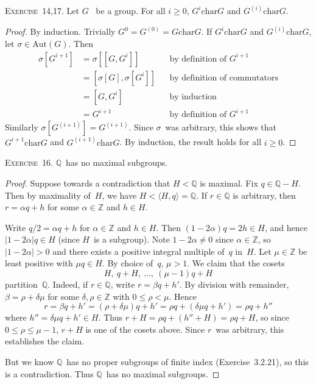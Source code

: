 \documentclass[letterpaper]{article}
\newcommand{\exercise}[1]{\goodbreak\noindent\textsc{Exercise~{#1}.}}
\newcommand{\Z}{\mathbb{Z}}
\newcommand{\Q}{\mathbb{Q}}
\newcommand{\aut}{\mathrm{Aut}}
\newcommand{\chr}{\mathrel{\mathrm{char}}}
\newcommand{\gen}[1]{\langle{#1}\rangle}
\newcommand{\abs}[1]{|{#1}|}
\begin{document}
\exercise{14,17}
Let $G$~ be a group. For all $i\ge0$, $G^i\chr G$ and $G^{(i)}\chr G$.
\begin{proof}
By induction. Trivially $G^0=G^{(0)}=G\chr G$. If $G^i\chr G$ and $G^{(i)}\chr G$, let $\sigma\in\aut(G)$. Then
\begin{align*}
\sigma[G^{i+1}]&=\sigma[[G,G^i]]&&\text{by definition of~$G^{i+1}$}\\
	&=[\sigma[G],\sigma[G^i]]&&\text{by definition of commutators}\\
	&=[G,G^i]&&\text{by induction}\\
	&=G^{i+1}&&\text{by definition of~$G^{i+1}$}
\end{align*}
Similarly $\sigma[G^{(i+1)}]=G^{(i+1)}$. Since $\sigma$~was arbitrary, this shows that $G^{i+1}\chr G$ and $G^{(i+1)}\chr G$. By induction, the result holds for all $i\ge0$.
\end{proof}

\exercise{16}
$\Q$~has no maximal subgroups.
\begin{proof}
Suppose towards a contradiction that $H<\Q$ is maximal. Fix $q\in\Q-H$. Then by maximality of~$H$, we have $H<\gen{H,q}=\Q$. If $r\in\Q$ is arbitrary, then $r=\alpha q+h$ for some $\alpha\in\Z$ and $h\in H$.

Write $q/2=\alpha q+h$ for $\alpha\in\Z$ and $h\in H$. Then $(1-2\alpha)q=2h\in H$, and hence $\abs{1-2\alpha}q\in H$ (since $H$~is a subgroup). Note $1-2\alpha\ne0$ since $\alpha\in\Z$, so $\abs{1-2\alpha}>0$ and there exists a positive integral multiple of~$q$ in~$H$. Let $\mu\in\Z$ be least positive with $\mu q\in H$. By choice of~$q$, $\mu>1$. We claim that the cosets
$$H,\ q+H,\ \ldots,\ (\mu-1)q+H$$
partition~$\Q$. Indeed, if $r\in\Q$, write $r=\beta q+h'$. By division with remainder, $\beta=\rho+\delta\mu$ for some $\delta,\rho\in\Z$ with $0\le\rho<\mu$. Hence
$$r=\beta q+h'=(\rho+\delta\mu)q+h'=\rho q+(\delta\mu q+h')=\rho q+h''$$
where $h''=\delta\mu q + h'\in H$. Thus $r+H=\rho q+(h''+H)=\rho q+H$, so since $0\le\rho\le\mu-1$, $r+H$ is one of the cosets above. Since $r$~was arbitrary, this establishes the claim.

But we know $\Q$~has no proper subgroups of finite index (Exercise~3.2.21), so this is a contradiction. Thus $\Q$~has no maximal subgroups.
\end{proof}
\end{document}
